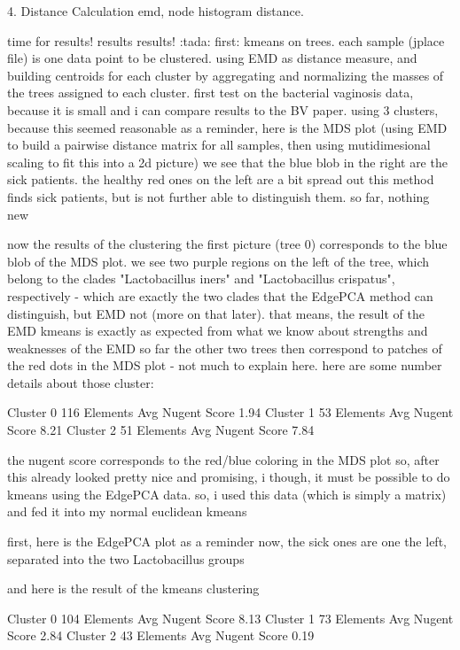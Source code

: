 4. Distance Calculation
emd, node histogram distance.


time for results! results results! :tada:
first: kmeans on trees. each sample (jplace file) is one data point to be clustered. using EMD as distance measure, and building centroids for each cluster by aggregating and normalizing the masses of the trees assigned to each cluster.
first test on the bacterial vaginosis data, because it is small and i can compare results to the BV paper.
using 3 clusters, because this seemed reasonable
as a reminder, here is the MDS plot (using EMD to build a pairwise distance matrix for all samples, then using mutidimesional scaling to fit this into a 2d picture)
we see that the blue blob in the right are the sick patients. the healthy red ones on the left are a bit spread out
this method finds sick patients, but is not further able to distinguish them. so far, nothing new

now the results of the clustering
the first picture (tree 0) corresponds to the blue blob of the MDS plot. we see two purple regions on the left of the tree, which belong to the clades "Lactobacillus iners" and "Lactobacillus crispatus", respectively - which are exactly the two clades that the EdgePCA method can distinguish, but EMD not (more on that later).
that means, the result of the EMD kmeans is exactly as expected from what we know about strengths and weaknesses of the EMD so far
the other two trees then correspond to patches of the red dots in the MDS plot - not much to explain here.
here are some number details about those cluster:

Cluster 0    116 Elements  Avg Nugent Score 1.94
Cluster 1    53 Elements   Avg Nugent Score 8.21
Cluster 2    51 Elements   Avg Nugent Score 7.84

the nugent score corresponds to the red/blue coloring in the MDS plot
so, after this already looked pretty nice and promising, i though, it must be possible to do kmeans using the EdgePCA data. so, i used this data (which is simply a matrix) and fed it into my normal euclidean kmeans

first, here is the EdgePCA plot as a reminder
now, the sick ones are one the left, separated into the two Lactobacillus groups

and here is the result of the kmeans clustering

Cluster 0    104 Elements    Avg Nugent Score 8.13
Cluster 1    73 Elements     Avg Nugent Score 2.84
Cluster 2    43 Elements     Avg Nugent Score 0.19

